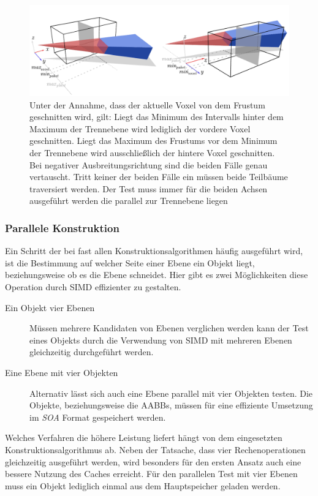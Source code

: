 \begin{figure}\centering
\includegraphics[width=1.0\textwidth]{images/frustum.pdf} 
\caption[Inverse Frustum culling]{Unter der Annahme, dass der aktuelle Voxel von dem Frustum geschnitten wird, gilt: Liegt das Minimum des Intervalls hinter dem Maximum der Trennebene wird lediglich der vordere Voxel geschnitten. Liegt das Maximum des Frustums vor dem Minimum der Trennebene wird ausschließlich der hintere Voxel geschnitten. Bei negativer Ausbreitungsrichtung sind die beiden Fälle genau vertauscht. Tritt keiner der beiden Fälle ein müssen beide Teilbäume traversiert werden. Der Test muss immer für die beiden Achsen ausgeführt werden die parallel zur Trennebene liegen}
\label{fig:frustum}
\end{figure}

\subsubsection{Parallele Konstruktion}

Ein Schritt der bei fast allen Konstruktionsalgorithmen häufig ausgeführt wird, ist die Bestimmung auf welcher Seite einer Ebene ein Objekt liegt, beziehungsweise ob es die Ebene schneidet. Hier gibt es zwei Möglichkeiten diese Operation durch SIMD effizienter zu gestalten.
\begin{description}
 \item[Ein Objekt vier Ebenen] Müssen mehrere Kandidaten von Ebenen verglichen werden kann der Test eines Objekts durch die Verwendung von SIMD mit mehreren Ebenen gleichzeitig durchgeführt werden.
 \item[Eine Ebene mit vier Objekten]Alternativ lässt sich auch eine Ebene parallel mit vier Objekten testen. Die Objekte, beziehungsweise die AABBs, müssen für eine effiziente Umsetzung im \textit{SOA} Format gespeichert werden.
 \end{description}
Welches Verfahren die höhere Leistung liefert hängt von dem eingesetzten Konstruktionsalgorithmus ab. Neben der Tatsache, dass vier Rechenoperationen gleichzeitig ausgeführt werden, wird besonders für den ersten Ansatz auch eine bessere Nutzung des Caches erreicht. Für den parallelen Test mit vier Ebenen muss ein Objekt lediglich einmal aus dem Hauptspeicher geladen werden.

